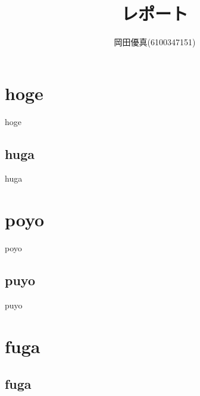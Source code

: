 \documentclass[lualatex,ja=standard]{bxjsarticle}
\title{レポート}
\author{岡田優真(6100347151)}
\date{}
\begin{document}
\maketitle

\section{hoge}

hoge

\subsection{huga}

huga

\section{poyo}

poyo

\subsection{puyo}

puyo

\section{fuga}

\subsection{fuga}
\end{document}
